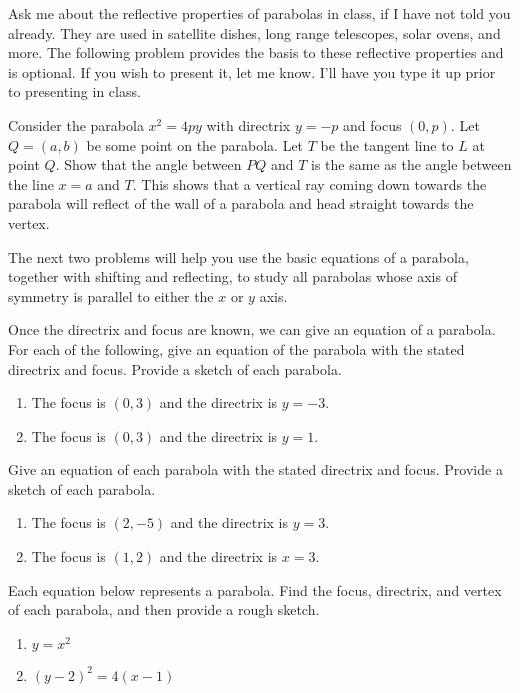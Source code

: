 Ask me about the reflective properties of parabolas in class, if I have not told you already.  They are used in satellite dishes, long range telescopes, solar ovens, and more.  The following problem provides the basis to these reflective properties and is optional.  If you wish to present it, let me know. I'll have you type it up prior to presenting in class.

\begin{problem*}[Optional]
Consider the parabola $x^2=4py$ with directrix $y=-p$ and focus $(0,p)$. Let $Q=(a,b)$ be some point on the parabola. Let $T$ be the tangent line to $L$ at point $Q$. Show that the angle between $PQ$ and $T$ is the same as the angle between the line $x=a$ and $T$. This shows that a vertical ray coming down towards the parabola will reflect of the wall of a parabola and head straight towards the vertex.    
\end{problem*}

The next two problems will help you use the basic equations of a parabola, together with shifting and reflecting, to study all parabolas whose axis of symmetry is parallel to either the $x$ or $y$ axis. 

\begin{problem} 
Once the directrix and focus are known, we can give an equation of a parabola. For each of the following, give an equation of the parabola with the stated directrix and focus. Provide a sketch of each parabola.
\begin{enumerate}
\item The focus is $(0,3)$ and the directrix is $y=-3$.
\item The focus is $(0,3)$ and the directrix is $y=1$.
\end{enumerate}
\end{problem}

\begin{problem}
Give an equation of each parabola with the stated directrix and focus. Provide a sketch of each parabola.
\begin{enumerate}
\item The focus is $(2,-5)$ and the directrix is $y=3$.
\item The focus is $(1,2)$ and the directrix is $x=3$.
\end{enumerate}
\end{problem}

\begin{problem}  
Each equation below represents a parabola.  Find the focus, directrix, and vertex of each parabola, and then provide a rough sketch.
\begin{enumerate}
\item $y=x^2$
\item $(y-2)^2=4(x-1)$
\end{enumerate}
\end{problem}

